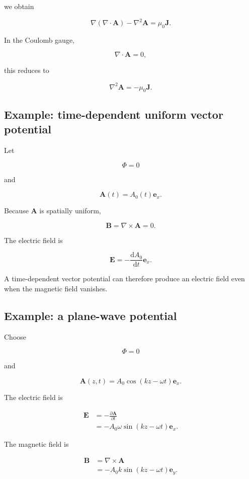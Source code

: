 we obtain

\[
\nabla
\left(
\nabla\cdot\mathbf{A}
\right)
-
\nabla^2\mathbf{A}
=
\mu_0\mathbf{J}.
\]

In the Coulomb gauge,

\[
\nabla\cdot\mathbf{A}=0,
\]

this reduces to

\[
\boxed{
\nabla^2\mathbf{A}
=
-\mu_0\mathbf{J}
}.
\]

\subsection{Example: time-dependent uniform vector potential}

Let

\[
\Phi=0
\]

and

\[
\mathbf{A}(t)
=
A_0(t)\mathbf{e}_x.
\]

Because \(\mathbf{A}\) is spatially uniform,

\[
\mathbf{B}
=
\nabla\times\mathbf{A}
=0.
\]

The electric field is

\[
\boxed{
\mathbf{E}
=
-
\frac{\mathrm{d}A_0}{\mathrm{d}t}
\mathbf{e}_x
}.
\]

A time-dependent vector potential can therefore produce an electric field even when the magnetic field vanishes.

\subsection{Example: a plane-wave potential}

Choose

\[
\Phi=0
\]

and

\[
\mathbf{A}(z,t)
=
A_0
\cos(kz-\omega t)
\mathbf{e}_x.
\]

The electric field is

\[
\begin{aligned}
\mathbf{E}
&=
-
\frac{\partial\mathbf{A}}{\partial t}\\
&=
-
A_0\omega
\sin(kz-\omega t)
\mathbf{e}_x.
\end{aligned}
\]

The magnetic field is

\[
\begin{aligned}
\mathbf{B}
&=
\nabla\times\mathbf{A}\\
&=
-A_0k
\sin(kz-\omega t)
\mathbf{e}_y.
\end{aligned}
\]

